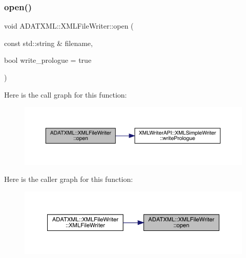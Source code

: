 \mbox{\label{classADATXML_1_1XMLFileWriter_a76f52e7ccdfe3b82875f30953cfd2447}} 
\subsubsection{\texorpdfstring{open()}{open()}\hspace{0.1cm}{\footnotesize\ttfamily [1/3]}}
{\footnotesize\ttfamily void A\+D\+A\+T\+X\+M\+L\+::\+X\+M\+L\+File\+Writer\+::open (\begin{DoxyParamCaption}\item[{const std\+::string \&}]{filename,  }\item[{bool}]{write\+\_\+prologue = {\ttfamily true} }\end{DoxyParamCaption})\hspace{0.3cm}{\ttfamily [inline]}}

Here is the call graph for this function\+:
\nopagebreak
\begin{figure}[H]
\begin{center}
\leavevmode
\includegraphics[width=350pt]{d6/ddb/classADATXML_1_1XMLFileWriter_a76f52e7ccdfe3b82875f30953cfd2447_cgraph}
\end{center}
\end{figure}
Here is the caller graph for this function\+:
\nopagebreak
\begin{figure}[H]
\begin{center}
\leavevmode
\includegraphics[width=350pt]{d6/ddb/classADATXML_1_1XMLFileWriter_a76f52e7ccdfe3b82875f30953cfd2447_icgraph}
\end{center}
\end{figure}
\mbox{\label{classADATXML_1_1XMLFileWriter_a76f52e7ccdfe3b82875f30953cfd2447}} 
